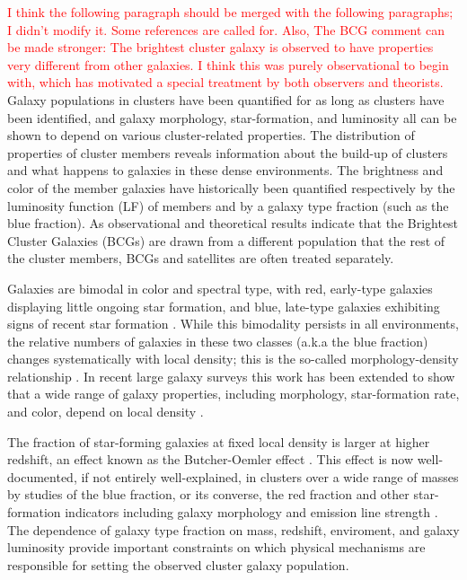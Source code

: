 \documentclass{emulateapj}
\begin{document}
\textcolor{red}{I think the following paragraph should be merged with the
following paragraphs; I didn't modify it. Some references are called for.
Also, The BCG comment can be made stronger: The brightest cluster galaxy is
observed to have properties very different from other galaxies.  I think this
was purely observational to begin with, which has motivated a special treatment
by both observers and theorists.} Galaxy populations in clusters have been
quantified for as long as clusters have been identified, and galaxy morphology,
star-formation, and luminosity all can be shown to depend on various
cluster-related properties.  The distribution of properties of cluster members
reveals information about the build-up of clusters and what happens to galaxies
in these dense environments.  The brightness and color of the member galaxies
have historically been quantified respectively by the luminosity function (LF)
of members and by  a galaxy type fraction (such as the blue fraction). As
observational and theoretical results indicate that the Brightest Cluster
Galaxies (BCGs) are drawn from a different population that the rest of the
cluster members, BCGs and satellites are often treated separately.

Galaxies are bimodal in color and spectral type, with red, early-type galaxies
displaying little ongoing star formation, and blue, late-type galaxies
exhibiting signs of recent star formation \citep[e.g.,][]{Strateva01, Baldry04,
Bell04, Menanteau06, Blanton05b}.  While this bimodality persists in all
environments, the relative numbers of galaxies in these two classes (a.k.a the
blue fraction) changes systematically with local density; this is the so-called
morphology-density relationship \citep{Oemler74,Dressler80}.  In recent large
galaxy surveys this work has been extended to show that a wide range of galaxy
properties, including morphology, star-formation rate, and color, depend on
local density 
\citep{Gomez03,Balogh04a,Balogh04b,Hogg04,Kauffmann04,Tovmassian04,Blanton05b,Christlein05,Croton05,Rojas05,Cooper06,Mandelbaum06,Cooper07}.

The fraction of star-forming galaxies at fixed local density is larger at
higher redshift, an effect known as the Butcher-Oemler effect
\citep{ButcherOemler}. This effect is now well-documented, if not entirely
well-explained, in clusters over a wide range of masses by studies of the blue
fraction, or its converse, the red fraction
\citep{Rakos95,Margoniner00,Ellingson01,KodamaBower01,Margoniner01,depropris04,Martinez06,Gerke07}
and other star-formation indicators including galaxy morphology and emission
line strength
\citep{AS93,ODB97,Balogh97,Couch98,vanDokkum00,Fasano00,Lubin02,Goto03,Treu03,Wilman05,Poggianti06,Desai07,vanderwel07}.
The dependence of galaxy type fraction on mass, redshift, enviroment, and galaxy
luminosity provide important constraints on which physical mechanisms are
responsible for setting the observed cluster galaxy population.
\end{document}
